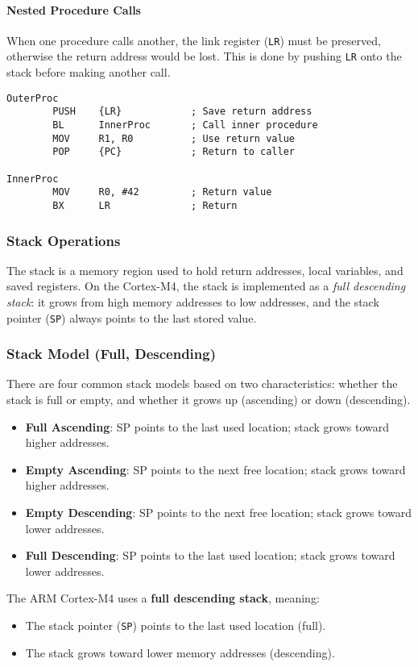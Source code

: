 \paragraph{Nested Procedure Calls}

When one procedure calls another, the link register (\texttt{LR}) must be preserved, otherwise the return address would be lost. This is done by pushing \texttt{LR} onto the stack before making another call.

\begin{lstlisting}[caption={Nested procedure example}]
OuterProc
        PUSH    {LR}            ; Save return address
        BL      InnerProc       ; Call inner procedure
        MOV     R1, R0          ; Use return value
        POP     {PC}            ; Return to caller

InnerProc 
        MOV     R0, #42         ; Return value
        BX      LR              ; Return
\end{lstlisting}

\subsubsection{Stack Operations}

The stack is a memory region used to hold return addresses, local variables, and saved registers.  
On the Cortex-M4, the stack is implemented as a \emph{full descending stack}: it grows from high memory addresses to low addresses, and the stack pointer (\texttt{SP}) always points to the last stored value.

\subsubsection{Stack Model (Full, Descending)}
There are four common stack models based on two characteristics: whether the stack is full or empty, and whether it grows up (ascending) or down (descending). 
\begin{itemize}[nosep]
    \item \textbf{Full Ascending}: SP points to the last used location; stack grows toward higher addresses.
    \item \textbf{Empty Ascending}: SP points to the next free location; stack grows toward higher addresses.
    \item \textbf{Empty Descending}: SP points to the next free location; stack grows toward lower addresses.
    \item \textbf{Full Descending}: SP points to the last used location; stack grows toward lower addresses.
\end{itemize}
The ARM Cortex-M4 uses a \textbf{full descending stack}, meaning:
\begin{itemize}[nosep]
    \item The stack pointer (\texttt{SP}) points to the last used location (full).
    \item The stack grows toward lower memory addresses (descending).
\end{itemize}
